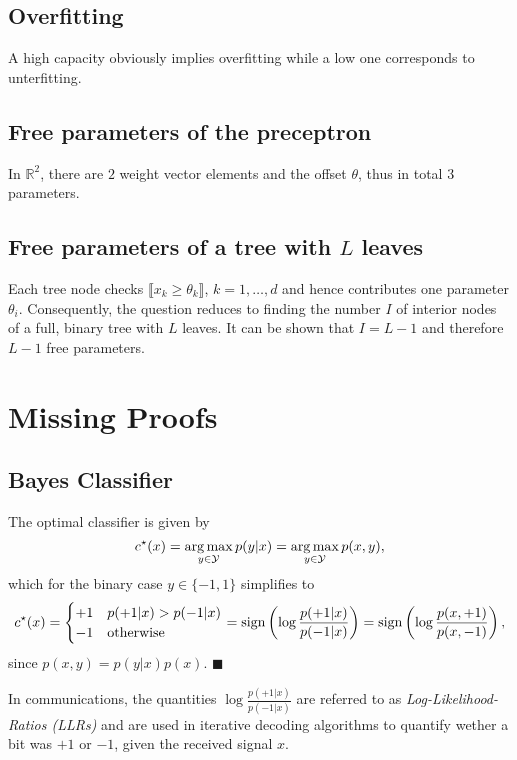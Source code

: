 \documentclass{scrartcl}
\begin{document}
	\subsection{Overfitting}
	A high capacity obviously implies overfitting while a low one corresponds to unterfitting. 
	\subsection{Free parameters of the preceptron}
	In $\mathbb R^2$, there are $2$ weight vector elements and the offset $\theta$, thus in total $3$ parameters.
	\subsection{Free parameters of a tree with $L$ leaves}
	Each tree node checks $\llbracket x_k \geq \theta_k\rrbracket$, $k=1,\dots,d$ and hence contributes one parameter $\theta_i$. Consequently, the question reduces to finding the number $I$ of interior nodes of a full, binary tree with $L$ leaves. It can be shown that $I=L-1$ and therefore $L-1$ free parameters.
	
\section{Missing Proofs}
\subsection{Bayes Classifier}
The optimal classifier is given by
\begin{equation}
	c^\star(x) = \operatorname*{arg\,max}_{y \in \mathcal Y} p(y| x) = \operatorname*{arg\,max}_{y \in \mathcal Y} p(x,y),
\end{equation}
which for the binary case $y\in\lbrace -1,1\rbrace$ simplifies to
\begin{equation}
	c^\star(x) = \begin{cases} +1 &  p(+1|x) > p(-1|x) \\ -1 &\text{otherwise}\end{cases} 
	=  \mathrm{sign} \left( \log  \frac{p(+1|x)}{p(-1|x)}\right)
	=  \mathrm{sign} \left( \log  \frac{p(x,+1)}{p(x,-1)}\right),
\end{equation}
since $p(x,y)=p(y|x)p(x)$. \hfill $\blacksquare$

In communications, the quantities $\log  \frac{p(+1|x)}{p(-1|x)}$ are referred to as \emph{Log-Likelihood-Ratios (LLRs)} and are used in iterative decoding algorithms to quantify wether a bit was $+1$ or $-1$, given the received signal $x$.
\end{document}
